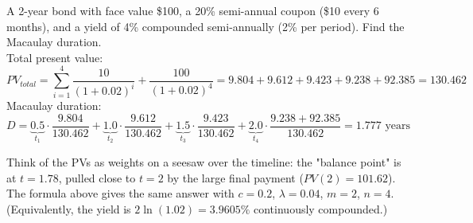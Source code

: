 \begin{example}
    A 2-year bond with face value \$100, a 20\% semi-annual coupon (\$10 every 6 months), and a yield of 4\% compounded semi-annually (2\% per period). Find the Macaulay duration.
    \\Total present value:
    \[PV_{total} = \sum_{i=1}^{4}\frac{10}{(1+0.02)^i} + \frac{100}{(1+0.02)^4} = 9.804 + 9.612 + 9.423 + 9.238 + 92.385 = 130.462\]
    Macaulay duration:
    \[D = \underbrace{0.5}_{t_1}\cdot\frac{9.804}{130.462} + \underbrace{1.0}_{t_2}\cdot\frac{9.612}{130.462} + \underbrace{1.5}_{t_3}\cdot\frac{9.423}{130.462} + \underbrace{2.0}_{t_4}\cdot\frac{9.238 + 92.385}{130.462} = 1.777 \text{ years}\]
    \begin{center}
    \end{center}
    Think of the PVs as weights on a seesaw over the timeline: the "balance point" is at $t = 1.78$, pulled close to $t = 2$ by the large final payment ($PV(2) = 101.62$). The formula above gives the same answer with $c = 0.2$, $\lambda = 0.04$, $m = 2$, $n = 4$.
    \\(Equivalently, the yield is $2\ln(1.02) = 3.9605\%$ continuously compounded.)
\end{example}

